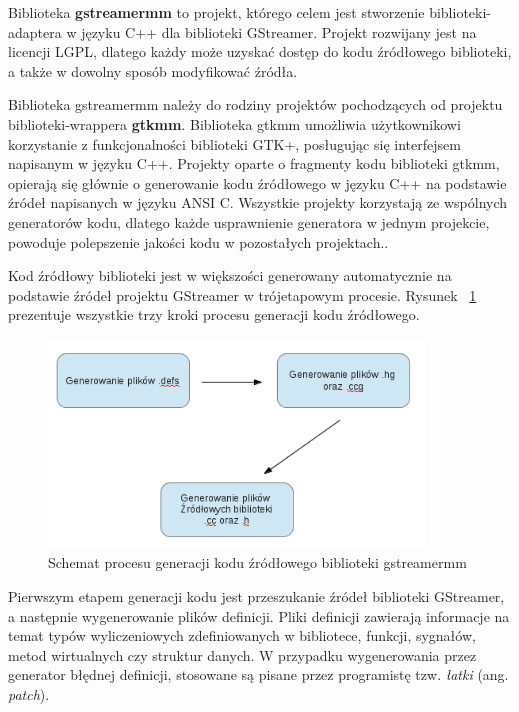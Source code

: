 \documentclass[12pt]{article}
\begin{document}
Biblioteka \textbf{gstreamermm} to projekt, którego celem jest stworzenie biblioteki-adaptera w języku C++ dla biblioteki GStreamer. Projekt rozwijany jest na licencji LGPL, dlatego każdy może uzyskać dostęp do kodu źródłowego biblioteki, a także w dowolny sposób modyfikować źródła.

Biblioteka gstreamermm należy do rodziny projektów pochodzących od projektu biblioteki-wrappera \textbf{gtkmm}. Biblioteka gtkmm umożliwia użytkownikowi korzystanie z funkcjonalności biblioteki GTK+, posługując się interfejsem napisanym w języku C++. Projekty oparte o fragmenty kodu biblioteki gtkmm, opierają się głównie o generowanie kodu źródłowego w języku C++ na podstawie źródeł napisanych w języku ANSI C. Wszystkie projekty korzystają ze wspólnych generatorów kodu, dlatego każde usprawnienie generatora w jednym projekcie, powoduje polepszenie jakości kodu w pozostałych projektach..

Kod źródłowy biblioteki jest w większości generowany automatycznie na podstawie źródeł projektu GStreamer w trójetapowym procesie. Rysunek ~\ref{fig:mmGenerateProcess} prezentuje wszystkie trzy kroki procesu generacji kodu źródłowego.
\begin{figure}[H]
  \includegraphics[width=100mm]{img/mm-generate-process.png}
  \caption{Schemat procesu generacji kodu źródłowego biblioteki gstreamermm}
  \label{fig:mmGenerateProcess}
\end{figure}
Pierwszym etapem generacji kodu jest przeszukanie źródeł biblioteki GStreamer, a następnie wygenerowanie plików definicji. Pliki definicji zawierają informacje na temat typów wyliczeniowych zdefiniowanych w bibliotece, funkcji, sygnałów, metod wirtualnych czy struktur danych. W przypadku wygenerowania przez generator błędnej definicji, stosowane są pisane przez programistę tzw. \textit{łatki} (ang. \textit{patch}).
\end{document}
